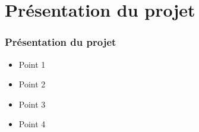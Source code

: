\section{Présentation du projet}

\begin{frame}
\frametitle{Présentation du projet}
\begin{itemize}
    \setlength\itemsep{2em}
    \item Point 1
    \item Point 2
    \item Point 3
    \item Point 4
\end{itemize}
\end{frame}
